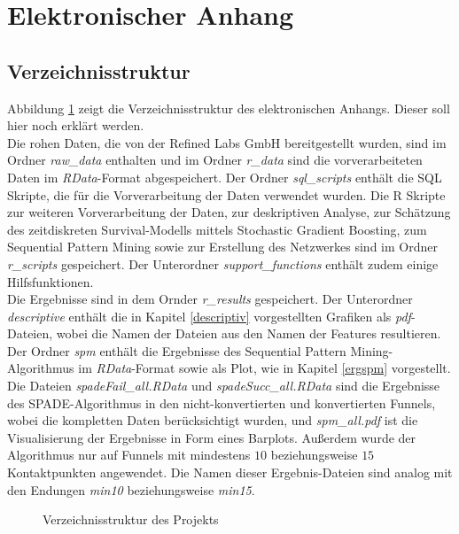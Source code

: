 \section{Elektronischer Anhang}\label{anhang}

\subsection{Verzeichnisstruktur}
Abbildung \ref{verz} zeigt die Verzeichnisstruktur des elektronischen Anhangs. Dieser soll hier noch erklärt werden.\\
Die rohen Daten, die von der Refined Labs GmbH bereitgestellt wurden, sind im Ordner \textit{raw\_data} enthalten und im Ordner \textit{r\_data} sind die vorverarbeiteten Daten im \textit{\mbox{RData}}-Format abgespeichert. Der Ordner \textit{sql\_scripts} enthält die SQL Skripte, die für die Vorverarbeitung der Daten verwendet wurden. Die R Skripte zur weiteren Vorverarbeitung der Daten, zur deskriptiven Analyse, zur Schätzung des zeitdiskreten Survival-Modells mittels Stochastic Gradient Boosting, zum Sequential Pattern Mining sowie zur Erstellung des Netzwerkes sind im Ordner \textit{r\_scripts} gespeichert. Der Unterordner \textit{support\_functions} enthält zudem einige Hilfsfunktionen.\\
Die Ergebnisse sind in dem Ornder \textit{r\_results} gespeichert. Der Unterordner \textit{descriptive} enthält die in Kapitel \ref{descriptiv} vorgestellten Grafiken als \textit{pdf}-Dateien, wobei die Namen der Dateien aus den Namen der Features resultieren.\\
Der Ordner \textit{spm} enthält die Ergebnisse des Sequential Pattern Mining-Algorithmus im \textit{RData}-Format sowie als Plot, wie in Kapitel \ref{ergspm} vorgestellt. Die Dateien \textit{spadeFail\_all.RData} und \textit{spadeSucc\_all.RData} sind die Ergebnisse des SPADE-Algorithmus in den nicht-konvertierten und konvertierten Funnels, wobei die kompletten Daten berücksichtigt wurden, und \textit{spm\_all.pdf} ist die Visualisierung der Ergebnisse in Form eines Barplots. Außerdem wurde der Algorithmus nur auf Funnels mit mindestens $10$ beziehungsweise $15$ Kontaktpunkten angewendet. Die Namen dieser Ergebnis-Dateien sind analog mit den Endungen \textit{min10} beziehungsweise \textit{min15}.
\begin{figure}[H]
\caption{Verzeichnisstruktur des Projekts}\label{verz}
\end{figure}
